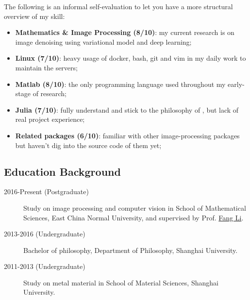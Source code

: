 The following is an informal self-evaluation to let you have a more structural overview of my skill:
\begin{itemize}
    \item \textbf{Mathematics \& Image Processing (8/10)}: my current research is on image denoising using variational model and deep learning;
    \item \textbf{Linux (7/10)}: heavy usage of docker, bash, git and vim in my daily work to maintain the servers;
    \item \textbf{Matlab (8/10)}: the only programming language used throughout my early-stage of research;
    \item \textbf{Julia (7/10)}: fully understand and stick to the philosophy of \langjulia, but lack of real project experience;
    \item \textbf{Related packages (6/10)}: familiar with other image-processing packages but haven't dig into the source code of them yet;
\end{itemize}

\subsection*{Education Background}

\begin{description}
    \item[2016-Present (Postgraduate)]Study on image processing and computer vision in School of Mathematical Sciences, East China Normal University, and supervised by Prof. \href{http://math.ecnu.edu.cn/~fli/}{\textsf{Fang Li}}.
    \item[2013-2016 (Undergraduate)] Bachelor of philosophy, Department of Philosophy, Shanghai University.
    \item[2011-2013 (Undergraduate)] Study on metal material in School of Material Sciences, Shanghai University.
\end{description}
